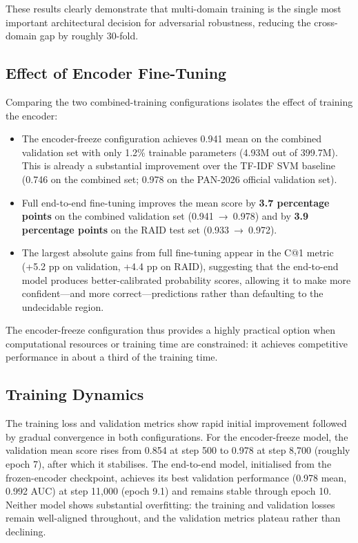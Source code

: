 \documentclass[]{ceurart}
\begin{document}
These results clearly demonstrate that multi-domain training is the single most important architectural decision for adversarial robustness, reducing the cross-domain gap by roughly 30-fold.

\subsection{Effect of Encoder Fine-Tuning}

Comparing the two combined-training configurations isolates the effect of training the encoder:

\begin{itemize}
  \item The encoder-freeze configuration achieves 0.941 mean on the combined validation set with only 1.2\% trainable parameters (4.93M out of 399.7M). This is already a substantial improvement over the TF-IDF SVM baseline (0.746 on the combined set; 0.978 on the PAN-2026 official validation set).
  \item Full end-to-end fine-tuning improves the mean score by \textbf{3.7 percentage points} on the combined validation set (0.941~→~0.978) and by \textbf{3.9 percentage points} on the RAID test set (0.933~→~0.972).
  \item The largest absolute gains from full fine-tuning appear in the C@1 metric (+5.2 pp on validation, +4.4 pp on RAID), suggesting that the end-to-end model produces better-calibrated probability scores, allowing it to make more confident—and more correct—predictions rather than defaulting to the undecidable region.
\end{itemize}

The encoder-freeze configuration thus provides a highly practical option when computational resources or training time are constrained: it achieves competitive performance in about a third of the training time.

\subsection{Training Dynamics}

The training loss and validation metrics show rapid initial improvement followed by gradual convergence in both configurations. For the encoder-freeze model, the validation mean score rises from 0.854 at step 500 to 0.978 at step 8,700 (roughly epoch 7), after which it stabilises. The end-to-end model, initialised from the frozen-encoder checkpoint, achieves its best validation performance (0.978 mean, 0.992 AUC) at step 11,000 (epoch 9.1) and remains stable through epoch 10. Neither model shows substantial overfitting: the training and validation losses remain well-aligned throughout, and the validation metrics plateau rather than declining.
\end{document}
